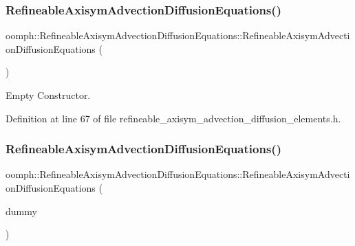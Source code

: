 \subsubsection{\texorpdfstring{Refineable\+Axisym\+Advection\+Diffusion\+Equations()}{RefineableAxisymAdvectionDiffusionEquations()}\hspace{0.1cm}{\footnotesize\ttfamily [1/2]}}
{\footnotesize\ttfamily oomph\+::\+Refineable\+Axisym\+Advection\+Diffusion\+Equations\+::\+Refineable\+Axisym\+Advection\+Diffusion\+Equations (\begin{DoxyParamCaption}{ }\end{DoxyParamCaption})\hspace{0.3cm}{\ttfamily [inline]}}



Empty Constructor. 



Definition at line 67 of file refineable\+\_\+axisym\+\_\+advection\+\_\+diffusion\+\_\+elements.\+h.

\mbox{\label{classoomph_1_1RefineableAxisymAdvectionDiffusionEquations_af90d33fc2e1dcf475f59ca5d8aefea22}} 
\subsubsection{\texorpdfstring{Refineable\+Axisym\+Advection\+Diffusion\+Equations()}{RefineableAxisymAdvectionDiffusionEquations()}\hspace{0.1cm}{\footnotesize\ttfamily [2/2]}}
{\footnotesize\ttfamily oomph\+::\+Refineable\+Axisym\+Advection\+Diffusion\+Equations\+::\+Refineable\+Axisym\+Advection\+Diffusion\+Equations (\begin{DoxyParamCaption}\item[{const \hyperlink{classoomph_1_1RefineableAxisymAdvectionDiffusionEquations}{Refineable\+Axisym\+Advection\+Diffusion\+Equations} \&}]{dummy }\end{DoxyParamCaption})\hspace{0.3cm}{\ttfamily [inline]}}



